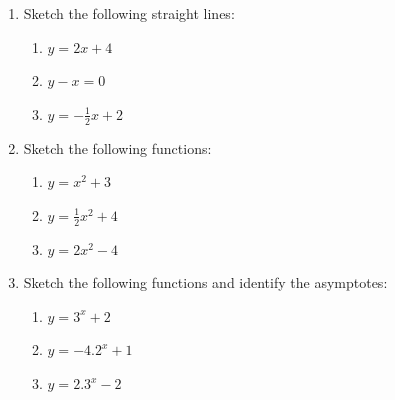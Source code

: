       
      \label{m39348*id253432}\begin{enumerate}[noitemsep, label=\textbf{\arabic*}. ] 
            \label{m39348*uid405}\item Sketch the following straight lines: 
\label{m39348*id254512}\begin{enumerate}[noitemsep, label=\textbf{\alph*}. ] 
            \item 
\begin{math}y=2x+4\end{math} \item 
\begin{math}y-x=0\end{math} \item  
\begin{math}y=-\frac{1}{2}x+2\end{math}\end{enumerate}
        
        \label{m39348*uid406}\item Sketch the following functions: 
\label{m39348*id254513}\begin{enumerate}[noitemsep, label=\textbf{\alph*}. ] 
            \item 
\begin{math}y={x}^{2}+3\end{math} \item 
\begin{math}y=\frac{1}{2}{x}^{2}+4\end{math}\item 
\begin{math}y=2{x}^{2}-4\end{math}\end{enumerate}
        
        \label{m39348*uid407}\item Sketch the following functions and identify the asymptotes: 
\label{m39348*id254514}\begin{enumerate}[noitemsep, label=\textbf{\alph*}. ] 
            \item 
\begin{math}y={3}^{x}+2\end{math} \item 
\begin{math}y=-4.{2}^{x}+1\end{math} \item 
\begin{math}y=2.{3}^{x}-2\end{math} \end{enumerate}
        

\end{enumerate}
